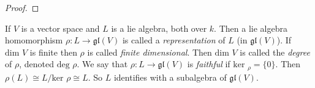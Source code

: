 \begin{proof}

\end{proof}

If $V$ is a vector space and $L$ is a lie algebra, both over $k$. Then a lie algebra homomorphism $\rho : L \to \mathfrak{gl}(V)$ is called a \emph{representation} of $L$ (in $\mathfrak{gl}(V)$). If $\text{dim } V$ is finite then $\rho$ is called \emph{finite dimensional}. Then $\text{dim } V$ is called the \emph{degree} of $\rho$, denoted $\text{deg }\rho$. We say that $\rho : L \to \mathfrak{gl}(V)$ is \emph{faithful} if $\text{ker }_\rho = \{ 0 \}$. Then $\rho(L) \cong L/\text{ker }\rho \cong L$. So $L$ identifies with a subalgebra of $\mathfrak{gl}(V)$.

